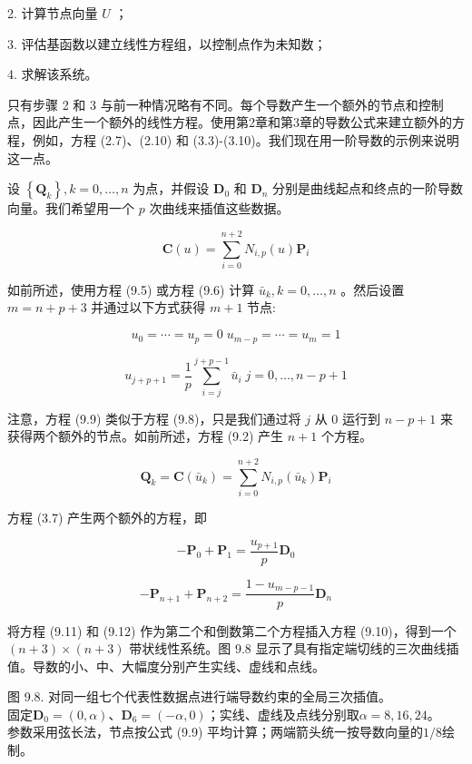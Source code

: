 \documentclass[../main.tex]{subfiles}
\begin{document}
2. 计算节点向量 \(U\) ；

3. 评估基函数以建立线性方程组，以控制点作为未知数；

4. 求解该系统。

只有步骤 2 和 3 与前一种情况略有不同。每个导数产生一个额外的节点和控制点，因此产生一个额外的线性方程。使用第2章和第3章的导数公式来建立额外的方程，例如，方程 (2.7)、(2.10) 和 (3.3)-(3.10)。我们现在用一阶导数的示例来说明这一点。

设 \(\left\{  {\mathbf{Q}}_{k}\right\}  ,k = 0,\ldots ,n\) 为点，并假设 \({\mathbf{D}}_{0}\) 和 \({\mathbf{D}}_{n}\) 分别是曲线起点和终点的一阶导数向量。我们希望用一个 \(p\) 次曲线来插值这些数据。

\[
\mathbf{C}\left( u\right)  = \mathop{\sum }\limits_{{i = 0}}^{{n + 2}}{N}_{i,p}\left( u\right) {\mathbf{P}}_{i}
\]

如前所述，使用方程 (9.5) 或方程 (9.6) 计算 \({\bar{u}}_{k},k = 0,\ldots ,n\) 。然后设置 \(m = n + p + 3\) 并通过以下方式获得 \(m + 1\) 节点:

\[
{u}_{0} = \cdots  = {u}_{p} = 0\;{u}_{m - p} = \cdots  = {u}_{m} = 1
\]

\[
{u}_{j + p + 1} = \frac{1}{p}\mathop{\sum }\limits_{{i = j}}^{{j + p - 1}}{\bar{u}}_{i}\;j = 0,\ldots ,n - p + 1 \tag{9.9}
\]

注意，方程 (9.9) 类似于方程 (9.8)，只是我们通过将 \(j\) 从 0 运行到 \(n - p + 1\) 来获得两个额外的节点。如前所述，方程 (9.2) 产生 \(n + 1\) 个方程。

\[
{\mathbf{Q}}_{k} = \mathbf{C}\left( {\bar{u}}_{k}\right)  = \mathop{\sum }\limits_{{i = 0}}^{{n + 2}}{N}_{i,p}\left( {\bar{u}}_{k}\right) {\mathbf{P}}_{i} \tag{9.10}
\]

方程 (3.7) 产生两个额外的方程，即

\[
- {\mathbf{P}}_{0} + {\mathbf{P}}_{1} = \frac{{u}_{p + 1}}{p}{\mathbf{D}}_{0} \tag{9.11}
\]

\[
- {\mathbf{P}}_{n + 1} + {\mathbf{P}}_{n + 2} = \frac{1 - {u}_{m - p - 1}}{p}{\mathbf{D}}_{n} \tag{9.12}
\]

将方程 (9.11) 和 (9.12) 作为第二个和倒数第二个方程插入方程 (9.10)，得到一个 \(\left( {n + 3}\right)  \times  \left( {n + 3}\right)\) 带状线性系统。图 9.8 显示了具有指定端切线的三次曲线插值。导数的小、中、大幅度分别产生实线、虚线和点线。

\begin{center}
\begin{minipage}{27cm}
\vspace*{.6\baselineskip}
\centering
{}
\par\smallskip
图 9.8. 对同一组七个代表性数据点进行端导数约束的全局三次插值。\\
固定$\mathbf D_0=(0,\alpha)$、$\mathbf D_6=(-\alpha,0)$；实线、虚线及点线分别取$\alpha=8,16,24$。\\
参数采用弦长法，节点按公式 (9.9) 平均计算；两端箭头统一按导数向量的$1/8$绘制。
\end{minipage}
\end{center}
\end{document}
